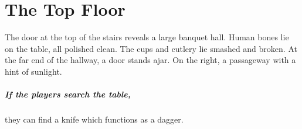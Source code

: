 \chapter{The Top Floor}

\setcounter{list}{0}

\begin{figure*}[t]
	
\end{figure*}


\begin{boxtext}

	The door at the top of the stairs reveals a large banquet hall.
	Human bones lie on the table, all polished clean.
	The cups and cutlery lie smashed and broken.
	At the far end of the hallway, a door stands ajar.
	On the right, a passageway with a hint of sunlight.

\end{boxtext}

\paragraph{If the players search the table,}
they can find a knife which functions as a dagger.










